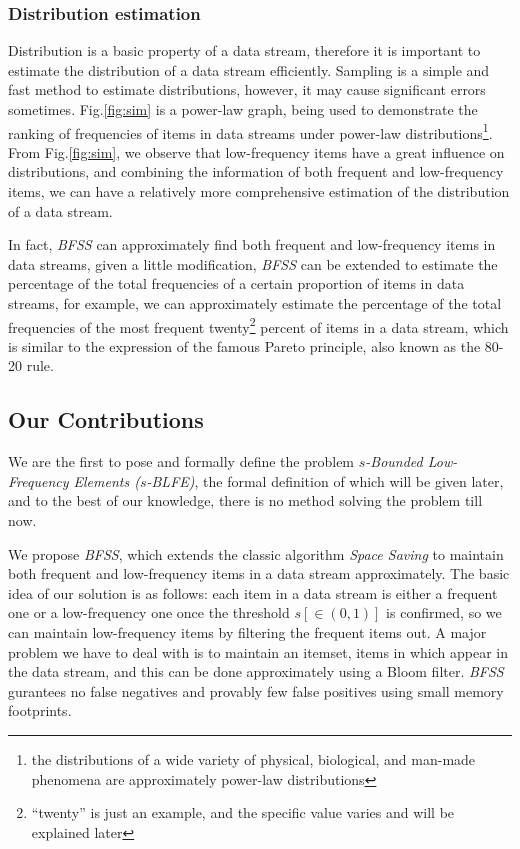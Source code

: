 \documentclass[conference]{IEEEtran}
\begin{document}
\subsubsection{Distribution estimation}\label{distribution estimation}
Distribution is a basic property of a data stream, therefore it is important to estimate the distribution of a data stream efficiently. Sampling is a simple and fast method to estimate distributions, however, it may cause significant errors sometimes. Fig.\ref{fig:sim} is a power-law graph, being used to demonstrate the ranking of frequencies of items in data streams under power-law distributions\footnote{the distributions of a wide variety of physical, biological, and man-made phenomena are approximately power-law distributions}. From Fig.\ref{fig:sim}, we observe that low-frequency items have a great influence on distributions, and combining the information of both frequent and low-frequency items, we can have a relatively more comprehensive estimation of the distribution of a data stream.\par 
In fact, \emph{BFSS} can approximately find both frequent and low-frequency items in data streams, given a little modification, \emph{BFSS} can be extended to estimate the percentage of the total frequencies of a certain proportion of items in data streams, for example, we can approximately estimate the percentage of the total frequencies of the most frequent twenty\footnote{``twenty'' is just an example, and the specific value varies and will be explained later} percent of items in a data stream, which is similar to the expression of the famous Pareto principle, also known as the 80-20 rule.

\subsection{Our Contributions}
We are the first to pose and formally define the problem $s$\emph{-Bounded Low-Frequency Elements ($s$-BLFE)}, the formal definition of which will be given later, and to the best of our knowledge, there is no method solving the problem till now.\par

We propose \emph{BFSS}, which extends the classic algorithm \emph{Space Saving} to maintain both frequent and low-frequency items in a data stream approximately. The basic idea of our solution is as follows: each item in a data stream is either a frequent one or a low-frequency one once the threshold $s[\in (0,1)]$ is confirmed, so we can maintain low-frequency items by filtering the frequent items out. A major problem we have to deal with is to maintain an itemset, items in which appear in the data stream, and this can be done approximately using a Bloom filter. \emph{BFSS} gurantees no false negatives and provably few false positives using small memory footprints.\par
\end{document}

